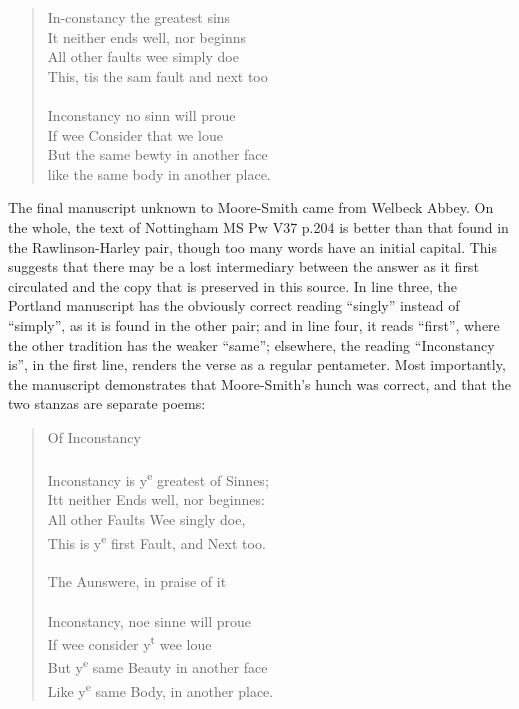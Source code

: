 \begin{paper}
\begin{quote}
In-constancy the greatest sins \\
It neither ends well, nor beginns \\ 
All other faults wee simply doe \\
This, tis the sam fault and next too \\ \\
Inconstancy no sinn will proue \\
If wee Consider that we loue \\
But the same bewty in another face \\
like the same body in another place.  
\end{quote}

\noindent The final manuscript unknown to Moore-Smith came from Welbeck Abbey. On
the whole, the text of Nottingham MS Pw V37 p.204 is better than that
found in the Rawlinson-Harley pair, though too many words have an
initial capital. This suggests that there may be a lost intermediary
between the answer as it first circulated and the copy that is preserved
in this source. In line three, the Portland manuscript has the obviously
correct reading ``singly'' instead of ``simply'', as it is found in the
other pair; and in line four, it reads ``first'', where the other
tradition has the weaker ``same''; elsewhere, the reading ``Inconstancy
is'', in the first line, renders the verse as a regular pentameter. Most
importantly, the manuscript demonstrates that Moore-Smith's hunch was
correct, and that the two stanzas are separate poems:

\begin{quote}
\-\hspace{1cm}Of Inconstancy \\ \\
Inconstancy is y\textsuperscript{e} greatest of Sinnes; \\
Itt neither Ends well, nor beginnes: \\
\-\hspace{.5cm}All other Faults Wee singly doe, \\
\-\hspace{.5cm}This is y\textsuperscript{e} first Fault, and Next too. \\ \\
\-\hspace{1cm}The Aunswere, in praise of it \\ \\
Inconstancy, noe sinne will proue \\
If wee consider y\textsuperscript{t} wee loue \\
\-\hspace{.5cm}But y\textsuperscript{e} same Beauty in another face \\
\-\hspace{.5cm}Like y\textsuperscript{e} same Body, in another place.
\end{quote}


\end{paper}
